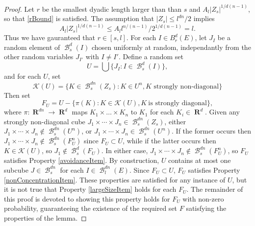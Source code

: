 \documentclass[dvipsnames,letterpaper,12pt]{article}
\numberwithin{equation}{section}
\theoremstyle{plain}
\DeclareMathOperator{\RR}{\mathbf{R}}
\DeclareMathOperator{\B}{\mathcal{B}}
\begin{document}
\begin{proof}
	Let $r$ be the smallest dyadic length larger than than $s$ and $A_l |Z_s|^{1/d(n-1)}$, so that \eqref{rBound} is satisfied. The assumption that $|Z_s| \leq l^{dn}/2$ implies
	\[ A_l |Z_s|^{1/d(n-1)} \leq A_l l^{n/(n-1)} / 2^{1/d(n-1)} = l. \]
	Thus we have gauranteed that $r \in [s,l]$. For each $I \in B_r^d(E)$, let $J_I$ be a random element of $\B^d_s(I)$ chosen uniformly at random, independantly from the other random variables $J_{I'}$ with $I \neq I'$. Define a random set
	\[ 	U = \bigcup \{ J_I : I \in \B^d_s(I) \}, \]
	and for each $U$, set
	\[ \mathcal{K}(U) = \{ K \in \B^{dn}_s(Z_s) : K \in U^n, \text{$K$ strongly non-diagonal} \} \]
	Then set
	\begin{equation} \label{defnOfF}
		F_U = U - \{ \pi(K): K \in \mathcal{K}(U), K\ \text{is strongly diagonal} \},
	\end{equation}
	where $\pi: \RR^{dn} \to \RR^d$ maps $K_1 \times \dots \times K_n$ to $K_1$ for each $K_i \in \RR^d$. Given any strongly non-diagonal cube $J_1 \times \cdots \times J_n \in \B_s^{dn}(Z_s)$, either $J_1 \times \cdots \times J_n \not \in \B_s^{dn}(U^n)$, or $J_1 \times \cdots \times J_n \in \B_s^{dn}(U^n)$. If the former occurs then $J_1 \times \cdots \times J_n \not \in \B_s^{dn}(F_U^n)$ since $F_U \subset U$, while if the latter occurs then $K \in \mathcal{K}(U)$, so $J_1 \not \in \B_s^d(F_U)$. In either case, $J_1 \times \cdots \times J_n \not \in \B_s^{dn}(F_U^n)$, so $F_U$ satisfies Property \ref{avoidanceItem}. By construction, $U$ contains at most one subcube $J \in \B^{dn}_s$ for each $I \in \B^{dn}_l(E)$. Since $F_U \subset U$, $F_U$ satisfies Property \ref{nonConcentrationItem}. These properties are satisfied for any instance of $U$, but it is not true that Property \ref{largeSizeItem} holds for each $F_U$. The remainder of this proof is devoted to showing this property holds for $F_U$ with non-zero probability, guaranteeing the existence of the required set $F$ satisfying the properties of the lemma.


\end{proof}
\end{document}
